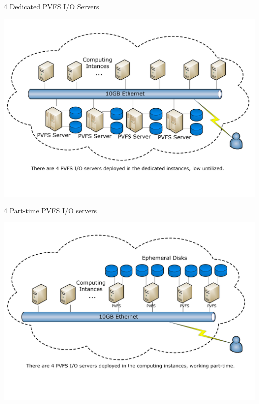 \documentclass{beamer}
\begin{document}
\begin{frame}{4 Dedicated PVFS I/O Servers}
    \begin{center}
        \includegraphics[width=\textwidth]{figures/visio/pvfs-4.pdf}
    \end{center}
\end{frame}

\begin{frame}{4 Part-time PVFS I/O servers}
    \begin{center}
        \includegraphics[width=\textwidth]{figures/visio/pvfs-4-parttime.pdf}
    \end{center}
\end{frame}
\end{document}
